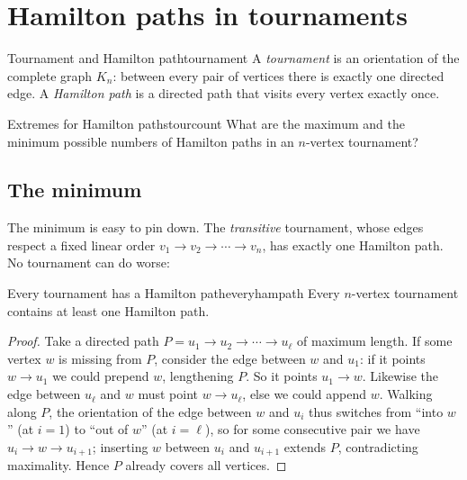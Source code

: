 \section{Hamilton paths in tournaments}

\begin{definition}{Tournament and Hamilton path}{tournament}
A \emph{tournament} is an orientation of the complete graph $K_n$: between
every pair of vertices there is exactly one directed edge. A \emph{Hamilton
path} is a directed path that visits every vertex exactly once.
\end{definition}

\begin{question}{Extremes for Hamilton paths}{tourcount}
What are the maximum and the minimum possible numbers of Hamilton paths in an
$n$-vertex tournament?
\end{question}

\subsection*{The minimum}

The minimum is easy to pin down. The \emph{transitive} tournament, whose
edges respect a fixed linear order $v_1\to v_2\to\cdots\to v_n$, has exactly
one Hamilton path. No tournament can do worse:

\begin{proposition}{Every tournament has a Hamilton path}{everyhampath}
Every $n$-vertex tournament contains at least one Hamilton path.
\end{proposition}

\begin{proof}
Take a directed path $P=u_1\to u_2\to\cdots\to u_\ell$ of maximum length. If
some vertex $w$ is missing from $P$, consider the edge between $w$ and $u_1$:
if it points $w\to u_1$ we could prepend $w$, lengthening $P$. So it points
$u_1\to w$. Likewise the edge between $u_\ell$ and $w$ must point $w\to
u_\ell$, else we could append $w$. Walking along $P$, the orientation of the
edge between $w$ and $u_i$ thus switches from ``into $w$'' (at $i=1$) to ``out
of $w$'' (at $i=\ell$), so for some consecutive pair we have
$u_i\to w\to u_{i+1}$; inserting $w$ between $u_i$ and $u_{i+1}$ extends $P$,
contradicting maximality. Hence $P$ already covers all vertices.
\end{proof}

